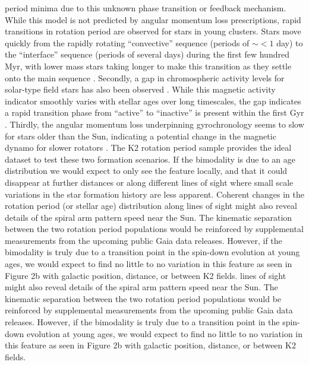\documentclass[useAMS, usenatbib, preprint, 12pt]{aastex}
\begin{document}
period minima due to this unknown phase transition or feedback mechanism.
While this model is not predicted by angular momentum loss prescriptions,
rapid transitions in rotation period are observed for stars in young clusters.
Stars move quickly from the rapidly rotating “convective” sequence (periods of
$\sim<1$ day) to the “interface” sequence (periods of several days) during the
first few hundred Myr, with lower mass stars taking longer to make this
transition as they settle onto the main sequence \citep{barnes2003}.
Secondly, a gap in chromospheric activity levels for solar-type field stars
has also been observed \citep{vaughan1980}.
While this magnetic activity indicator smoothly varies with stellar ages over
long timescales, the gap indicates a rapid transition phase from “active” to
“inactive” is present within the first Gyr \citep{pace2009}.
Thirdly, the angular momentum loss underpinning gyrochronology seems to slow
for stars older than the Sun, indicating a potential change in the magnetic
dynamo for slower rotators \citep{angus2015, vansaders2016}.
The K2 rotation period sample provides the ideal dataset to test these two
formation scenarios.
If the bimodality is due to an age distribution we would expect to only see
the feature locally, and that it could disappear at further distances or along
different lines of sight where small scale variations in the star formation
history are less apparent.
Coherent changes in the rotation period (or stellar age) distribution along
lines of sight might also reveal details of the spiral arm pattern speed near
the Sun.
The kinematic separation between the two rotation period populations would be
reinforced by supplemental measurements from the upcoming public Gaia data
releases.
However, if the bimodality is truly due to a transition point in the spin-down
evolution at young ages, we would expect to find no little to no variation in
this feature as seen in Figure 2b with galactic position, distance, or between
K2 fields.
lines of sight might also reveal details of the spiral arm pattern speed near
the Sun.
The kinematic separation between the two rotation period populations would be
reinforced by supplemental measurements from the upcoming public Gaia data
releases.
However, if the bimodality is truly due to a transition point in the spin-down
evolution at young ages, we would expect to find no little to no variation in
this feature as seen in Figure 2b with galactic position, distance, or between
K2 fields.
\end{document}
